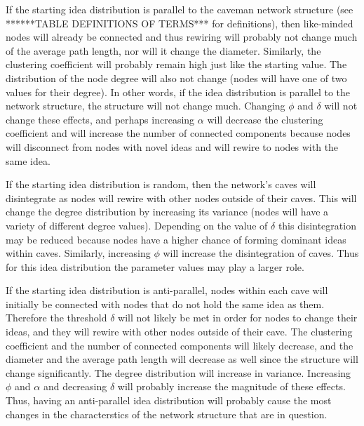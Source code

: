 If the starting idea distribution is parallel to the caveman network structure (see ******TABLE DEFINITIONS OF TERMS*** for definitions), then like-minded nodes will already be connected and thus rewiring will probably not change much of the average path length, nor will it change the diameter. Similarly, the clustering coefficient will probably remain high just like the starting value. The distribution of the node degree will also not change (nodes will have one of two values for their degree). In other words, if the idea distribution is parallel to the network structure, the structure will not change much. Changing $\phi$ and $\delta$ will not change these effects, and perhaps increasing $\alpha$ will decrease the clustering coefficient and will increase the number of connected components because nodes will disconnect from nodes with novel ideas and will rewire to nodes with the same idea.

If the starting idea distribution is random, then the network's caves will disintegrate as nodes will rewire with other nodes outside of their caves. This will change the degree distribution by increasing its variance (nodes will have a variety of different degree values). Depending on the value of $\delta$ this disintegration may be reduced because nodes have a higher chance of forming dominant ideas within caves. Similarly, increasing $\phi$ will increase the disintegration of caves. Thus for this idea distribution the parameter values may play a larger role.

If the starting idea distribution is anti-parallel, nodes within each cave will initially be connected with nodes that do not hold the same idea as them. Therefore the threshold $\delta$ will not likely be met in order for nodes to change their ideas, and they will rewire with other nodes outside of their cave. The clustering coefficient and the number of connected components will likely decrease, and the diameter and the average path length will decrease as well since the structure will change significantly. The degree distribution will increase in variance. Increasing $\phi$ and $\alpha$ and decreasing $\delta$ will probably increase the magnitude of these effects. Thus, having an anti-parallel idea distribution will probably cause the most changes in the characterstics of the network structure that are in question.



